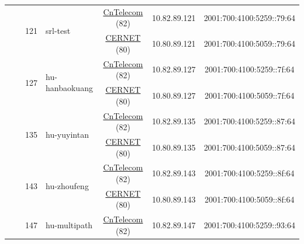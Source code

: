 \begin{small}
\begin{center}
\begin{longtable}{|c|c|c|c|c|c|c|c|}
  &  & \multirow{2}{*}{\tiny{121}} & \multicolumn{1}{|l|}{\multirow{2}{*}{\tiny{srl-test}}} & \multicolumn{2}{|c|}{\tiny{\href{http://www.chinatelecom.com.cn}{CnTelecom} (82)}} & \tiny{10.82.89.121} & \tiny{2001:700:4100:5259::79:64} \\* \cline{5-5}\cline{6-6}\cline{7-7}\cline{8-8}
  &  &  &  & \multicolumn{2}{|c|}{\tiny{\href{http://www.cernet.edu.cn}{CERNET} (80)}} & \tiny{10.80.89.121} & \tiny{2001:700:4100:5059::79:64} \\* \cline{3-3}\cline{4-4}\cline{5-5}\cline{6-6}\cline{7-7}\cline{8-8}
  &  & \multirow{2}{*}{\tiny{127}} & \multicolumn{1}{|l|}{\multirow{2}{*}{\tiny{hu-hanbaokuang}}} & \multicolumn{2}{|c|}{\tiny{\href{http://www.chinatelecom.com.cn}{CnTelecom} (82)}} & \tiny{10.82.89.127} & \tiny{2001:700:4100:5259::7f:64} \\* \cline{5-5}\cline{6-6}\cline{7-7}\cline{8-8}
  &  &  &  & \multicolumn{2}{|c|}{\tiny{\href{http://www.cernet.edu.cn}{CERNET} (80)}} & \tiny{10.80.89.127} & \tiny{2001:700:4100:5059::7f:64} \\* \cline{3-3}\cline{4-4}\cline{5-5}\cline{6-6}\cline{7-7}\cline{8-8}
  &  & \multirow{2}{*}{\tiny{135}} & \multicolumn{1}{|l|}{\multirow{2}{*}{\tiny{hu-yuyintan}}} & \multicolumn{2}{|c|}{\tiny{\href{http://www.chinatelecom.com.cn}{CnTelecom} (82)}} & \tiny{10.82.89.135} & \tiny{2001:700:4100:5259::87:64} \\* \cline{5-5}\cline{6-6}\cline{7-7}\cline{8-8}
  &  &  &  & \multicolumn{2}{|c|}{\tiny{\href{http://www.cernet.edu.cn}{CERNET} (80)}} & \tiny{10.80.89.135} & \tiny{2001:700:4100:5059::87:64} \\* \cline{3-3}\cline{4-4}\cline{5-5}\cline{6-6}\cline{7-7}\cline{8-8}
  &  & \multirow{2}{*}{\tiny{143}} & \multicolumn{1}{|l|}{\multirow{2}{*}{\tiny{hu-zhoufeng}}} & \multicolumn{2}{|c|}{\tiny{\href{http://www.chinatelecom.com.cn}{CnTelecom} (82)}} & \tiny{10.82.89.143} & \tiny{2001:700:4100:5259::8f:64} \\* \cline{5-5}\cline{6-6}\cline{7-7}\cline{8-8}
  &  &  &  & \multicolumn{2}{|c|}{\tiny{\href{http://www.cernet.edu.cn}{CERNET} (80)}} & \tiny{10.80.89.143} & \tiny{2001:700:4100:5059::8f:64} \\* \cline{3-3}\cline{4-4}\cline{5-5}\cline{6-6}\cline{7-7}\cline{8-8}
  &  & \multirow{2}{*}{\tiny{147}} & \multicolumn{1}{|l|}{\multirow{2}{*}{\tiny{hu-multipath}}} & \multicolumn{2}{|c|}{\tiny{\href{http://www.chinatelecom.com.cn}{CnTelecom} (82)}} & \tiny{10.82.89.147} & \tiny{2001:700:4100:5259::93:64} \\* \cline{5-5}\cline{6-6}\cline{7-7}\cline{8-8}

\end{longtable}
\end{center}
\end{small}
